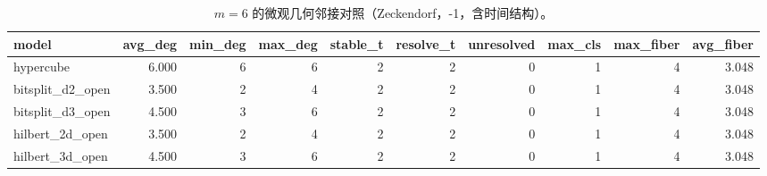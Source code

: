 \begin{table}[H]
\centering
\caption{$m=6$ 的微观几何邻接对照（Zeckendorf，\WL{}-1，含时间结构）。}
\label{tab:m6_models_compare}
\begin{tabular}{lrrr|rr|rr|rr}
\toprule
model & avg\_deg & min\_deg & max\_deg & stable\_t & resolve\_t & unresolved & max\_cls & max\_fiber & avg\_fiber\\
\midrule
hypercube & 6.000 & 6 & 6 & 2 & 2 & 0 & 1 & 4 & 3.048\\
bitsplit\_d2\_open & 3.500 & 2 & 4 & 2 & 2 & 0 & 1 & 4 & 3.048\\
bitsplit\_d3\_open & 4.500 & 3 & 6 & 2 & 2 & 0 & 1 & 4 & 3.048\\
hilbert\_2d\_open & 3.500 & 2 & 4 & 2 & 2 & 0 & 1 & 4 & 3.048\\
hilbert\_3d\_open & 4.500 & 3 & 6 & 2 & 2 & 0 & 1 & 4 & 3.048\\
\bottomrule
\end{tabular}
\end{table}
